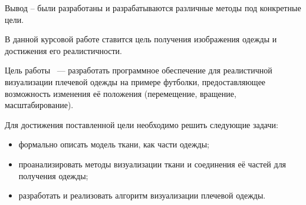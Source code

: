 Вывод -- были разработаны и разрабатываются различные методы под конкретные цели.

В данной курсовой работе ставится цель получения изображения одежды и достижения его реалистичности.

Цель работы ~--- разработать программное обеспечение для реалистичной
визуализации плечевой одежды на примере футболки, предоставляющее возможность
изменения её положения (перемещение, вращение, масштабирование).

Для достижения поставленной цели необходимо решить следующие задачи:
\begin{itemize}[left=\parindent] \item  формально описать модель ткани, как
            части одежды; \item  проанализировать методы визуализации ткани и
            соединения её частей для получения одежды; \item  разработать и
                реализовать алгоритм визуализации плечевой одежды.
\end{itemize}

